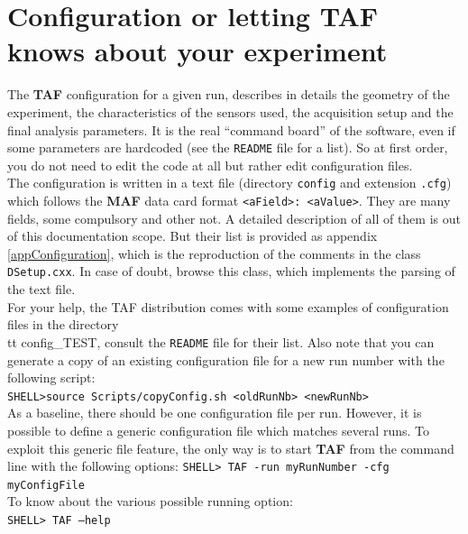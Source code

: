 \documentclass[a4paper, 12pt, twoside]{article}
\newcommand{\TAF}{{\bf TAF }}
\newcommand{\MAF}{{\bf MAF }}
\begin{document}
\vspace{2cm}

\section{Configuration or letting TAF knows about your experiment}
\label{secConfig}

The \TAF  configuration for a given run, describes in details the geometry of the experiment, the characteristics of the sensors used, the acquisition setup and the final analysis parameters. It is the real ``command board'' of the software, even if some parameters are hardcoded (see the {\tt README} file for a list). So at first order, you do not need to edit the code at all but rather edit configuration files.\\

\noindent
The configuration is written in a text file (directory {\tt config} and extension {\tt .cfg}) which follows the \MAF  data card format {\tt <aField>: <aValue>}. They are many fields, some compulsory and other not. A detailed description of all of them is out of this documentation scope. But their list is provided as appendix \ref{appConfiguration}, which is the reproduction of the comments in the class {\tt DSetup.cxx}. In case of doubt, browse this class, which implements the parsing of the text file.\\

\noindent
For your help, the TAF distribution comes with some examples of configuration files in the directory {\\tt config\_TEST}, consult the {\tt README} file for their list. Also note that you can generate a copy of an existing configuration file for a new run number with the following script:\\
{\tt SHELL>source Scripts/copyConfig.sh <oldRunNb> <newRunNb>}\\

\noindent
As a baseline, there should be one configuration file per run. However, it is possible to define a generic configuration file which matches several runs. To exploit this generic file feature, the only way is to start \TAF from the command line with the following options:
{\tt SHELL> TAF  -run myRunNumber -cfg myConfigFile}\\

\noindent
To know about the various possible running option:\\
{\tt SHELL> TAF --help}\\
\end{document}
